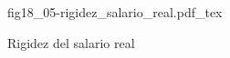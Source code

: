 \begin{figure}[h]
\centering
\def\svgwidth{0.5\textwidth}
{fig18_05-rigidez_salario_real.pdf_tex}
\caption{Rigidez del salario real}
\label{fig18_05-rigidez_salario_real}
\end{figure}